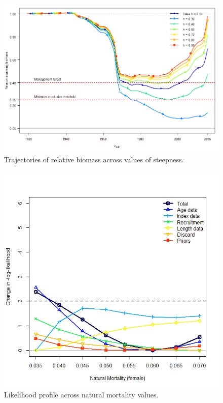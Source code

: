 \documentclass[12pt,]{article}
\begin{document}
\FloatBarrier

\begin{figure}
\centering
\includegraphics{Figures/h_trajectories.png}
\caption{Trajectories of relative biomass across values of steepness.
\label{fig:h_trajectory}}
\end{figure}

\FloatBarrier

\begin{figure}
\centering
\includegraphics{Figures/m_like.png}
\caption{Likelihood profile across natural mortality values.
\label{fig:m_like}}
\end{figure}
\end{document}
